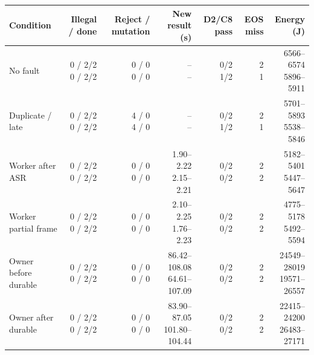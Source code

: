 \begin{tabular}{lrrrrrr}
\toprule
Condition & Illegal / done & Reject / mutation & New result (s) & D2/C8 pass & EOS miss & Energy (J) \\
\midrule
No fault & \shortstack{0 / 2/2\\0 / 2/2} & \shortstack{0 / 0\\0 / 0} & \shortstack{--\\--} & \shortstack{0/2\\1/2} & \shortstack{2\\1} & \shortstack{6566--6574\\5896--5911} \\
Duplicate / late & \shortstack{0 / 2/2\\0 / 2/2} & \shortstack{4 / 0\\4 / 0} & \shortstack{--\\--} & \shortstack{0/2\\1/2} & \shortstack{2\\1} & \shortstack{5701--5893\\5538--5846} \\
Worker after ASR & \shortstack{0 / 2/2\\0 / 2/2} & \shortstack{0 / 0\\0 / 0} & \shortstack{1.90--2.22\\2.15--2.21} & \shortstack{0/2\\0/2} & \shortstack{2\\2} & \shortstack{5182--5401\\5447--5647} \\
Worker partial frame & \shortstack{0 / 2/2\\0 / 2/2} & \shortstack{0 / 0\\0 / 0} & \shortstack{2.10--2.25\\1.76--2.23} & \shortstack{0/2\\0/2} & \shortstack{2\\2} & \shortstack{4775--5178\\5492--5594} \\
Owner before durable & \shortstack{0 / 2/2\\0 / 2/2} & \shortstack{0 / 0\\0 / 0} & \shortstack{86.42--108.08\\64.61--107.09} & \shortstack{0/2\\0/2} & \shortstack{2\\2} & \shortstack{24549--28019\\19571--26557} \\
Owner after durable & \shortstack{0 / 2/2\\0 / 2/2} & \shortstack{0 / 0\\0 / 0} & \shortstack{83.90--87.05\\101.80--104.44} & \shortstack{0/2\\0/2} & \shortstack{2\\2} & \shortstack{22415--24200\\26483--27171} \\
\bottomrule
\end{tabular}
